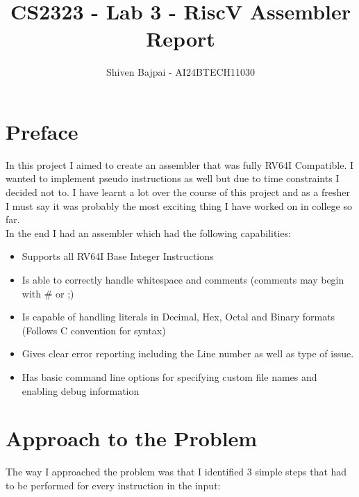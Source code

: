 \documentclass[12pt]{article}
\begin{document}
	
	\vspace{3cm}

	\title{CS2323 - Lab 3 - RiscV Assembler Report}
	\author{Shiven Bajpai - AI24BTECH11030}

	\maketitle
	\bigskip    	

	\renewcommand{\thefigure}{\theenumi}
	\renewcommand{\thetable}{\theenumi}

	\tableofcontents
	\newpage

    \section{Preface}
    In this project I aimed to create an assembler that was fully RV64I Compatible. I wanted to implement pseudo instructions as well but due to time constraints I decided not to. I have learnt a lot over the course of this project and as a fresher I must say it was probably the most exciting thing I have worked on in college so far.
    \\

    In the end I had an assembler which had the following capabilities:
    \begin{itemize}
        \item Supports all RV64I Base Integer Instructions
        \item Is able to correctly handle whitespace and comments (comments may begin with # or ;)
        \item Is capable of handling literals in Decimal, Hex, Octal and Binary formats (Follows C convention for syntax)
        \item Gives clear error reporting including the Line number as well as type of issue.
        \item Has basic command line options for specifying custom file names and enabling debug information
    \end{itemize}

    \section{Approach to the Problem}

    The way I approached the problem was that I identified 3 simple steps that had to be performed for every instruction in the input:
\end{document}
